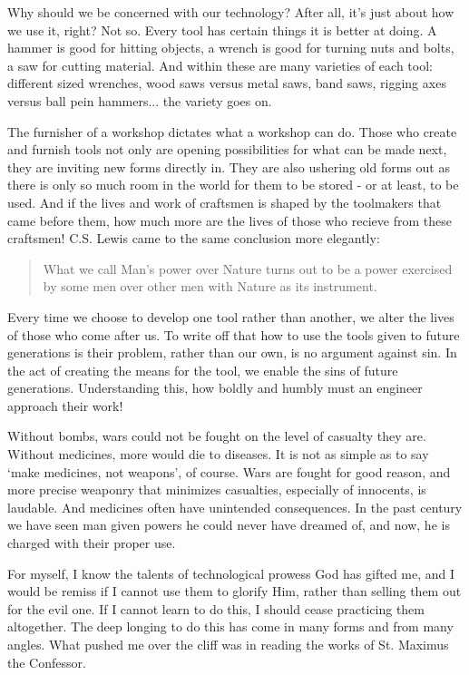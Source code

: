 \documentclass[letterpaper]{article}
\begin{document}
Why should we be concerned with our technology? After all, it's just about how we use it, right? Not so. Every tool has certain things it is better at doing. A hammer is good for hitting objects, a wrench is good for turning nuts and bolts, a saw for cutting material. And within these are many varieties of each tool: different sized wrenches, wood saws versus metal saws, band saws, rigging axes versus ball pein hammers... the variety goes on.

The furnisher of a workshop dictates what a workshop can do. Those who create and furnish tools not only are opening possibilities for what can be made next, they are inviting new forms directly in. They are also ushering old forms out as there is only so much room in the world for them to be stored - or at least, to be used. And if the lives and work of craftsmen is shaped by the toolmakers that came before them, how much more are the lives of those who recieve from these craftsmen! C.S. Lewis came to the same conclusion more elegantly:

\begin{quote}
  What we call Man's power over Nature turns out to be a power exercised by some men over other men with Nature as its instrument.
\end{quote}

Every time we choose to develop one tool rather than another, we alter the lives of those who come after us. To write off that how to use the tools given to future generations is their problem, rather than our own, is no argument against sin. In the act of creating the means for the tool, we enable the sins of future generations. Understanding this, how boldly and humbly must an engineer approach their work!

Without bombs, wars could not be fought on the level of casualty they are. Without medicines, more would die to diseases. It is not as simple as to say `make medicines, not weapons', of course. Wars are fought for good reason, and more precise weaponry that minimizes casualties, especially of innocents, is laudable. And medicines often have unintended consequences. In the past century we have seen man given powers he could never have dreamed of, and now, he is charged with their proper use.

\iffalse
For myself, I know the talents of technological prowess God has gifted me, and I would be remiss if I cannot use them to glorify Him, rather than selling them out for the evil one. If I cannot learn to do this, I should cease practicing them altogether. The deep longing to do this has come in many forms and from many angles. What pushed me over the cliff was in reading the works of St. Maximus the Confessor.
\end{document}
